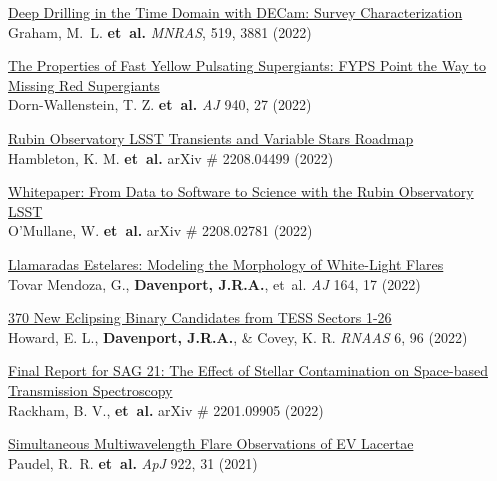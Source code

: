 \begin{etaremune}[leftmargin=10pt]

\item{\sc\href{https://arxiv.org/abs/2211.09202}{\color{NavyBlue}Deep Drilling in the Time Domain with DECam: Survey Characterization}}\\
Graham, M.~L. {\bf et~al.} {\em MNRAS}, 519, 3881 (2022)


\item{\sc \href{https://arxiv.org/abs/2206.11917}{\color{NavyBlue}The Properties of Fast Yellow Pulsating Supergiants: FYPS Point the Way to Missing Red Supergiants}}\\
Dorn-Wallenstein, T. Z. {\bf et~al.} {\em AJ} 940, 27 (2022)

\item{\sc  \href{https://arxiv.org/abs/2208.04499}{\color{NavyBlue}Rubin Observatory LSST Transients and Variable Stars Roadmap}}\\
Hambleton, K. M. {\bf et~al.}  arXiv \# 2208.04499 (2022)

\item{\sc  \href{https://arxiv.org/abs/2208.02781}{\color{NavyBlue}Whitepaper: From Data to Software to Science with the Rubin Observatory LSST}}\\
O'Mullane, W. {\bf et~al.}  arXiv \# 2208.02781 (2022)

\item {\sc \href{https://ui.adsabs.harvard.edu/abs/2022AJ....164...17M/abstract}{\color{NavyBlue}Llamaradas Estelares: Modeling the Morphology of White-Light Flares}}\\
Tovar Mendoza, G., {\bf Davenport,  J.R.A.}, et~al. {\em AJ} 164, 17 (2022)

\item {\sc \href{https://iopscience.iop.org/article/10.3847/2515-5172/ac6e42}{\color{NavyBlue}370 New Eclipsing Binary Candidates from TESS Sectors 1-26}}\\
Howard, E. L., {\bf Davenport,  J.R.A.}, \& Covey, K. R. {\em RNAAS} 6, 96  (2022)

\item{\sc \href{https://ui.adsabs.harvard.edu/abs/2022arXiv220109905R/abstract}{\color{NavyBlue} Final Report for SAG 21: The Effect of Stellar Contamination on Space-based Transmission Spectroscopy}}\\
Rackham, B. V., {\bf et~al.}  arXiv \# 2201.09905 (2022)



\item{\sc \href{https://arxiv.org/abs/2108.04753}{\color{NavyBlue} Simultaneous Multiwavelength Flare Observations of EV Lacertae}}\\
Paudel, R.~R. {\bf et~al.} {\em ApJ} 922, 31 (2021)




\end{etaremune}

